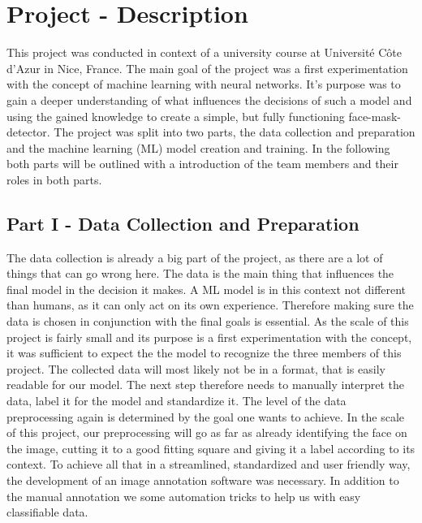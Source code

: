 
\section{Project - Description}

This project was conducted in context of a university course at Université Côte
d'Azur in Nice, France. The main goal of the project was a first experimentation
with the concept of machine learning with neural networks. It's purpose was to
gain a deeper understanding of what influences the decisions of such a model and
using the gained knowledge to create a simple, but fully functioning
face-mask-detector.
\newline
The project was split into two parts, the data collection and preparation and
the machine learning (ML) model creation and training. In the following both
parts will be outlined with a introduction of the team members and their roles
in both parts.

\subsection{Part I - Data Collection and Preparation}

The data collection is already a big part of the project, as there are a lot of
things that can go wrong here. The data is the main thing that influences the
final model in the decision it makes. A ML model is in this context not
different than humans, as it can only act on its own experience. Therefore
making sure the data is chosen in conjunction with the final goals is essential.
As the scale of this project is fairly small and its purpose is a first
experimentation with the concept, it was sufficient to expect the the model to
recognize the three members of this project.
\newline
The collected data will most likely not be in a format, that is easily readable
for our model. The next step therefore needs to manually interpret the data,
label it for the model and standardize it. The level of the data preprocessing
again is determined by the goal one wants to achieve. In the scale of this
project, our preprocessing will go as far as already identifying the face on the
image, cutting it to a good fitting square and giving it a label according to
its context.
To achieve all that in a streamlined, standardized and user friendly way, the
development of an image annotation software was necessary. In addition to the
manual annotation we some automation tricks to help us with easy classifiable
data. 

